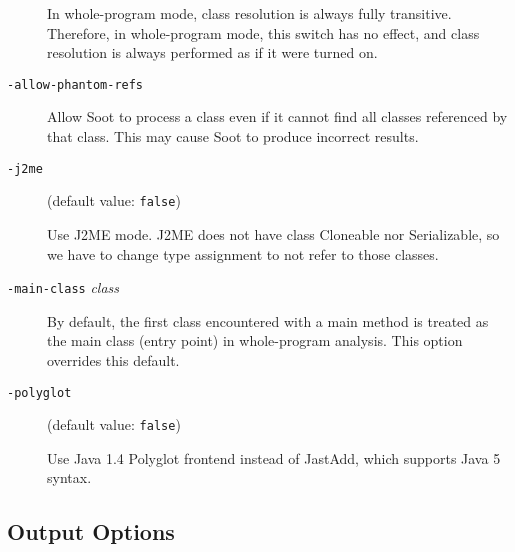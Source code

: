 \documentclass{article}
\begin{document}
\begin{description}
In whole-program mode, class resolution is always fully transitive. Therefore,
in whole-program mode, this switch has no effect, and class resolution is
always performed as if it were turned on.



  \item[
  {\tt -allow-phantom-refs}]

Allow Soot to process a class even if it cannot find all classes
referenced by that class. This may cause Soot to produce
incorrect results.



  \item[
  {\tt -j2me}]

(default value: {\tt false})

Use J2ME mode. J2ME does not have class Cloneable nor Serializable, so we have
to change type assignment to not refer to those classes.			



  \item[
  {\tt -main-class}{ \it class}]


\par

By default, the first class encountered with a main method is treated
as the main class (entry point) in whole-program analysis. This option
overrides this default.




  \item[
  {\tt -polyglot}]

(default value: {\tt false})

Use Java 1.4 Polyglot frontend instead of JastAdd, which supports Java 5 syntax.



\end{description}


\subsection{Output Options}
\end{document}
